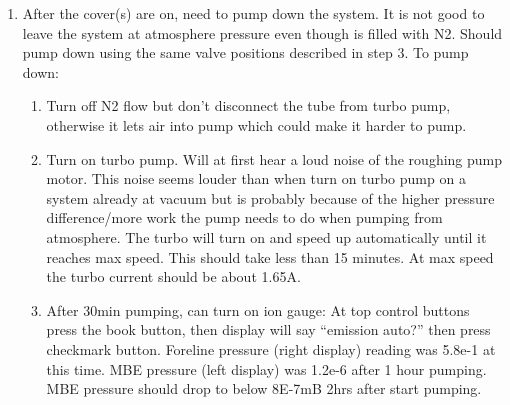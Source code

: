 \begin{enumerate}
\item	 After the cover(s) are on, need to pump down the system. It is not good to leave the system at atmosphere pressure even though is filled with N2. Should pump down using the same valve positions described in step 3. To pump down:
\begin{enumerate}
\item	Turn off N2 flow but don’t disconnect the tube from turbo pump, otherwise it lets air into pump which could make it harder to pump. 
\item	Turn on turbo pump. Will at first hear a loud noise of the roughing pump motor. This noise seems louder than when turn on turbo pump on a system already at vacuum but is probably because of the higher pressure difference/more work the pump needs to do when pumping from atmosphere. The turbo will turn on and speed up automatically until it reaches max speed. This should take less than 15 minutes. At max speed the turbo current should be about 1.65A.
\item	After 30min pumping, can turn on ion gauge: At top control buttons press the book button, then display will say “emission auto?” then press checkmark button. Foreline pressure (right display) reading was 5.8e-1 at this time. MBE pressure (left display) was 1.2e-6 after 1 hour pumping. MBE pressure should drop to below 8E-7mB 2hrs after start pumping.
\end{enumerate}
\end{enumerate}



